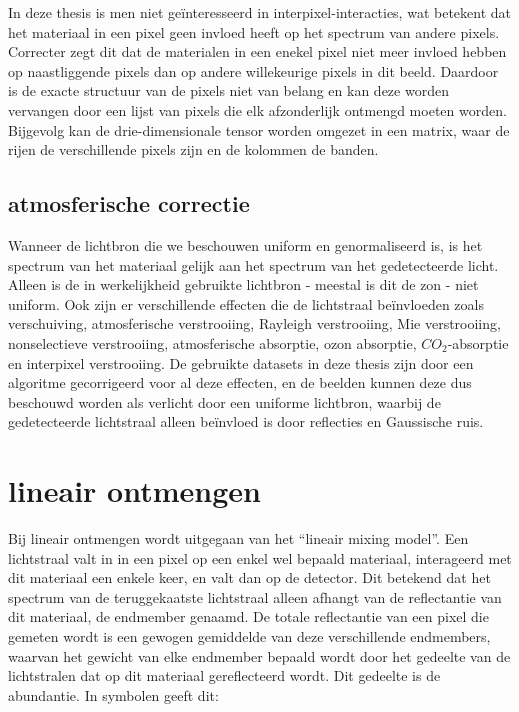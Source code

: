 \documentclass[12pt]{report}
\begin{document}
In deze thesis is men niet ge\"interesseerd in  interpixel-interacties, wat betekent dat het materiaal in een pixel geen invloed heeft op het spectrum van andere pixels. Correcter zegt dit dat de materialen in een enekel pixel niet meer invloed hebben op naastliggende pixels dan op andere willekeurige pixels in dit beeld. Daardoor is de exacte structuur van de pixels niet van belang en kan deze worden vervangen door een lijst van pixels die elk afzonderlijk ontmengd moeten worden.  Bijgevolg kan de drie-dimensionale tensor worden omgezet in een matrix, waar de rijen de verschillende pixels zijn en de kolommen de banden.  





\subsection{atmosferische correctie}

Wanneer de lichtbron die we beschouwen uniform en genormaliseerd is, is het spectrum van het materiaal gelijk aan het spectrum van het gedetecteerde licht. Alleen is de in werkelijkheid gebruikte lichtbron - meestal is dit de zon - niet uniform. Ook zijn er verschillende effecten die de lichtstraal be\"invloeden\cite{fun} zoals verschuiving, atmosferische verstrooiing, Rayleigh verstrooiing, Mie verstrooiing, nonselectieve verstrooiing, atmosferische absorptie, ozon absorptie, $CO_2$-absorptie en interpixel verstrooiing. De gebruikte datasets in deze thesis zijn door een algoritme gecorrigeerd voor al deze effecten, en de beelden kunnen  deze dus beschouwd worden als verlicht door een uniforme lichtbron, waarbij de gedetecteerde lichtstraal alleen be\"invloed is door reflecties en Gaussische ruis. 

\section{lineair ontmengen}

Bij lineair ontmengen wordt uitgegaan van het ``lineair mixing model''. Een lichtstraal valt in in een pixel op een enkel wel bepaald materiaal, interageerd met dit materiaal een enkele keer, en valt dan op de detector. Dit betekend dat het spectrum van de teruggekaatste lichtstraal alleen afhangt van de reflectantie van dit materiaal, de endmember genaamd. De totale reflectantie van een pixel die gemeten wordt is een gewogen gemiddelde van deze verschillende endmembers, waarvan het gewicht van elke endmember bepaald wordt door het gedeelte van de lichtstralen dat op dit materiaal gereflecteerd wordt. Dit gedeelte is de abundantie. In symbolen geeft dit:
\end{document}

